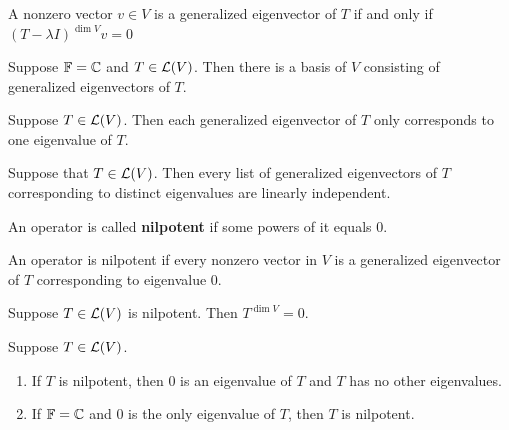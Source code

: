 \documentclass{extarticle}
\begin{document}
\begin{remark}
    A nonzero vector \(v \in V\) is a generalized eigenvector 
    of \(T\) if and only if \((T - \lambda I)^{\dim V} v = 0\)
\end{remark}

\begin{thm}
    Suppose \(\mathbb{F} = \mathbb{C}\) and \(T \in \mathcal{L}(V)\). Then 
    there is a basis of \(V\) consisting of generalized 
    eigenvectors of \(T\).    
\end{thm}

\begin{proposition}
    Suppose \(T \in \mathcal{L}(V)\). Then each generalized 
    eigenvector of \(T\) only corresponds to one eigenvalue 
    of \(T\).
\end{proposition}

\begin{proposition}
    Suppose that \(T \in \mathcal{L}(V)\). Then every list of 
    generalized eigenvectors of \(T\) corresponding to 
    distinct eigenvalues are linearly independent.
\end{proposition}

\begin{definition}[nilpotent]
    An operator is called \textbf{nilpotent} if some powers
    of it equals 0.    
\end{definition}

\begin{remark}
    An operator is nilpotent if every nonzero vector in 
    \(V\) is a generalized eigenvector of \(T\) corresponding 
    to eigenvalue 0. 
\end{remark}

\begin{corollary}
    Suppose \(T \in \mathcal{L}(V)\) is nilpotent. Then \(T^{\dim V} = 0\).
\end{corollary}

\begin{thm}
    Suppose \(T \in \mathcal{L}(V)\). 
    \begin{enumerate}[label=(\alph*)]
        \item If \(T\) is nilpotent, then \(0\) is an eigenvalue of \(T\) and \(T\) has no other 
        eigenvalues. 
        \item If \(\mathbb{F} = \mathbb{C}\) and \(0\) is the only eigenvalue of \(T\), then \(T\) is nilpotent.
    \end{enumerate}
\end{thm}
\end{document}
